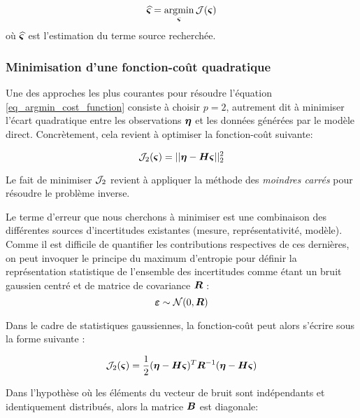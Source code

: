 \begin{equation}
\widehat{{\bm{\varsigma}}} = \operatorname*{\arg\!\min}_{\bm{\varsigma}} \mathcal{J}({\bm{\varsigma}})
\label{eq_argmin_cost_function}
\end{equation}
où $\widehat{{\bm{\varsigma}}}$ est l'estimation du terme source recherchée.

\subsubsection{Minimisation d'une fonction-coût quadratique}

Une des approches les plus courantes pour résoudre l'équation \eqref{eq_argmin_cost_function} consiste à choisir $p=2$, autrement dit à minimiser l'écart quadratique entre les observations ${\bm{\eta}}$ et les données générées par le modèle direct. Concrètement, cela revient à optimiser la fonction-coût suivante:

\begin{equation}
{\mathcal{J}}_{2}({\bm{\varsigma}}) = ||{\bm{\eta}} - {\bm{H}} {\bm{\varsigma}} ||_2^2
\label{eq_cost_MCO}
\end{equation}

Le fait de minimiser ${\mathcal{J}}_2$ revient à appliquer la méthode des \textit{moindres carrés} pour résoudre le problème inverse. 

Le terme d'erreur que nous cherchons à minimiser est une combinaison des différentes sources d'incertitudes existantes (mesure, représentativité, modèle). Comme il est difficile de quantifier les contributions respectives de ces dernières, on peut invoquer le principe du maximum d'entropie pour définir la représentation statistique de l'ensemble des incertitudes comme étant un bruit gaussien centré et de matrice de covariance ${\bm{R}}$ : 
\begin{equation}
{\bm{\varepsilon}} \sim \mathcal{N}(0,{\bm{R}})
\label{eq_bruit_obs}
\end{equation}

Dans le cadre de statistiques gaussiennes, la fonction-coût peut alors s'écrire sous la forme suivante \cite{Winiarek2011}:

\begin{equation}
\mathcal{J}_2({\bm{\varsigma}}) = \dfrac{1}{2}({\bm{\eta}} - {\bm{H}} {\bm{\varsigma}})^T {\bm{R}}^{-1}({\bm{\eta}} - {\bm{H}}{\bm{\varsigma}})
\label{eq_cost_forme2}
\end{equation}

{Dans l'hypothèse où les éléments du vecteur de bruit sont indépendants et identiquement distribués, alors la matrice ${\bm{B}}$ est diagonale:}
	
